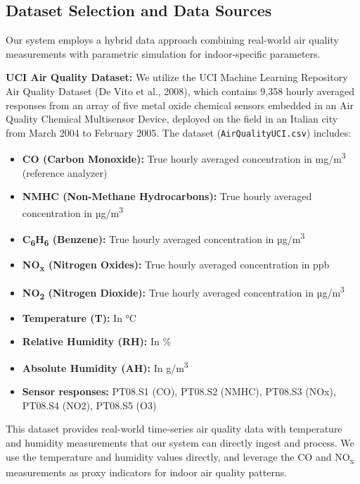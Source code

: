 \documentclass[12pt]{report}
\begin{document}
\subsection{Dataset Selection and Data Sources}
Our system employs a hybrid data approach combining real-world air quality measurements with parametric simulation for indoor-specific parameters.

\textbf{UCI Air Quality Dataset:} We utilize the UCI Machine Learning Repository Air Quality Dataset (De Vito et al., 2008), which contains 9,358 hourly averaged responses from an array of five metal oxide chemical sensors embedded in an Air Quality Chemical Multisensor Device, deployed on the field in an Italian city from March 2004 to February 2005. The dataset (\texttt{AirQualityUCI.csv}) includes:
\begin{itemize}
  \item \textbf{CO (Carbon Monoxide):} True hourly averaged concentration in mg/m\textsuperscript{3} (reference analyzer)
  \item \textbf{NMHC (Non-Methane Hydrocarbons):} True hourly averaged concentration in µg/m\textsuperscript{3}
  \item \textbf{C\textsubscript{6}H\textsubscript{6} (Benzene):} True hourly averaged concentration in µg/m\textsuperscript{3}
  \item \textbf{NO\textsubscript{x} (Nitrogen Oxides):} True hourly averaged concentration in ppb
  \item \textbf{NO\textsubscript{2} (Nitrogen Dioxide):} True hourly averaged concentration in µg/m\textsuperscript{3}
  \item \textbf{Temperature (T):} In °C
  \item \textbf{Relative Humidity (RH):} In \%
  \item \textbf{Absolute Humidity (AH):} In g/m\textsuperscript{3}
  \item \textbf{Sensor responses:} PT08.S1 (CO), PT08.S2 (NMHC), PT08.S3 (NOx), PT08.S4 (NO2), PT08.S5 (O3)
\end{itemize}

This dataset provides real-world time-series air quality data with temperature and humidity measurements that our system can directly ingest and process. We use the temperature and humidity values directly, and leverage the CO and NO\textsubscript{x} measurements as proxy indicators for indoor air quality patterns.
\end{document}
